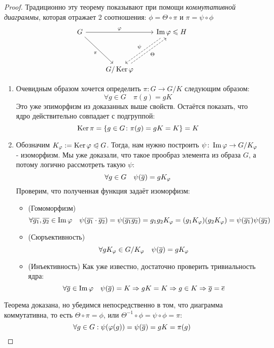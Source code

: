 \begin{proof}
	Традиционно эту теорему показывают при помощи \textit{коммутативной диаграммы}, которая отражает 2 соотношения: $\phi = \Theta \circ \pi$ и $\pi = \psi \circ \phi$
	\[
	\begin{tikzcd}[row sep = huge]
		G \arrow{rr}{\phi} \arrow[swap]{dr}{\pi} && \im \phi \le H \arrow[dashrightarrow, swap, xshift = -4pt]{dl}{\psi}\\
		& G / \ke \phi \arrow[dashrightarrow, swap, xshift = 4pt]{ur}{\Theta} &
	\end{tikzcd}
	\]
	\begin{enumerate}
		\item Очевидным образом хочется определить $\pi \colon G \to G / K$ следующим образом:
		\[
			\forall g \in G \quad \pi(g) = gK
		\]
		Это уже эпиморфизм из доказанных выше свойств. Остаётся показать, что ядро действительно совпадает с подгруппой:
		\[
			\operatorname{Ker} \pi = \{g \in G \colon \pi(g) = gK = K\} = K
		\]
		
		\item Обозначим $K_{\varphi} := \operatorname{Ker} \varphi \trianglelefteqslant G$. Тогда, нам нужно построить $\psi \colon \operatorname{Im} \varphi \to G / K_{\varphi}$ - изоморфизм. Мы уже доказали, что такое прообраз элемента из образа $G$, а потому логично рассмотреть такую $\psi$:
		\[
			\forall g \in G \quad \psi(\overline{g}) = gK_{\varphi}
		\]
		Проверим, что полученная функция задаёт изоморфизм:
		\begin{itemize}
			\item (Гомоморфизм)
			\[
				\forall \overline{g_1}, \overline{g_2} \in \operatorname{Im} \varphi \quad \psi(\overline{g_1} \cdot \overline{g_2}) = \psi(\overline{g_1 g_2}) = g_1 g_2 K_{\varphi} = (g_1 K_{\varphi})(g_2 K_{\varphi}) = \psi(\overline{g_1}) \psi(\overline{g_2})
			\]
			
			\item (Сюръективность)
			\[
				\forall gK_{\varphi} \in G / K_{\varphi} \quad \psi(\overline{g}) = gK_{\varphi}
			\]
			
			\item (Инъективность) Как уже известно, достаточно проверить тривиальность ядра:
			\[
				\forall \overline{g} \in \operatorname{Im} \varphi \quad \psi(\overline{g}) = K \Rightarrow gK = K \Rightarrow g \in K \Rightarrow \overline{g} = \overline{e}
			\]
		\end{itemize}
	\end{enumerate}
	Теорема доказана, но убедимся непосредственно в том, что диаграмма коммутативна, то есть $\Theta \circ \pi = \phi$, или $\Theta^{-1} \circ \phi = \psi \circ \phi = \pi$:
	\[
		\forall g \in G: \psi(\varphi(g)) = \psi(\overline{g}) = gK = \pi(g)
	\]
\end{proof}

